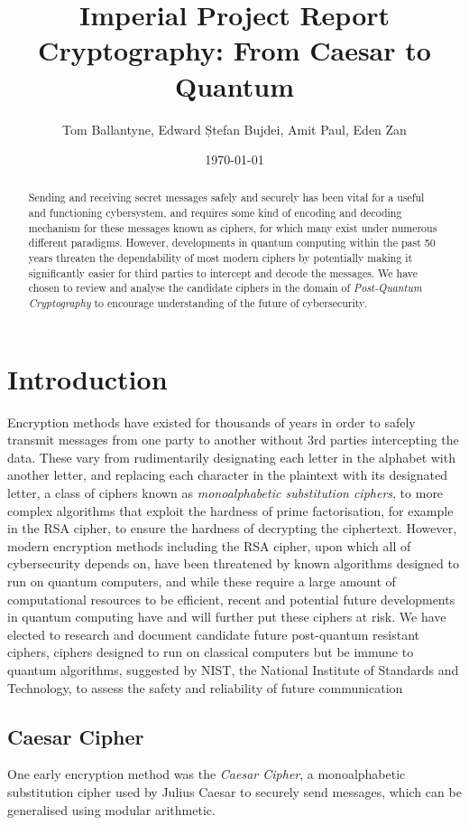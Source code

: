 \documentclass{article}
\title{Imperial Project Report \\ 
Cryptography: From Caesar to Quantum}
\author{Tom Ballantyne, Edward Ștefan Bujdei, Amit Paul, Eden Zan}
\date{\today} %
\begin{document}
\maketitle

\begin{abstract}
Sending and receiving secret messages safely and securely has been vital for
a useful and functioning cybersystem, and requires some kind of encoding
and decoding mechanism for these messages known as ciphers, for which many
exist under numerous different paradigms. However, developments in quantum
computing within the past 50 years threaten the dependability of most modern
ciphers by potentially making it significantly easier for third parties to
intercept and decode the messages. We have chosen to review and analyse the
candidate ciphers in the domain of \textit{Post-Quantum Cryptography} to
encourage understanding of the future of cybersecurity.
\end{abstract}

\newpage

\tableofcontents

\section{Introduction}
Encryption methods have existed for thousands of years in order to safely
transmit messages from one party to another without 3rd parties
intercepting the data. These vary from rudimentarily designating each
letter in the alphabet with another letter, and replacing each character in
the plaintext with its designated letter, a class of ciphers known as
\textit{monoalphabetic substitution ciphers}, to more complex algorithms
that exploit the hardness of prime factorisation, for example in the RSA
cipher, to ensure the hardness of decrypting the ciphertext. However,
modern encryption methods including the RSA cipher, upon which all of
cybersecurity depends on, have been threatened by known algorithms designed
to run on quantum computers, and while these require a large amount of
computational resources to be efficient, recent and potential future
developments in quantum computing have and will further put these ciphers
at risk. We have elected to research and document candidate future
post-quantum resistant ciphers, ciphers designed to run on classical
computers but be immune to quantum algorithms, suggested by NIST, the
National Institute of Standards and Technology, to assess the safety and
reliability of future communication

\subsection{Caesar Cipher}
One early encryption method was the \textit{Caesar Cipher}, a monoalphabetic 
substitution cipher used by Julius Caesar to securely send messages, which can
be generalised using modular arithmetic.
\medskip
\end{document}
